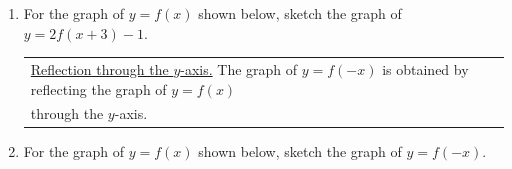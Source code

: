 \begin{enumerate}
\newpage
\item For the graph of $y=f(x)$ shown below, sketch the graph of $y=2f(x+3)-1$. \\
%
%
%
%



\begin{tabular}{| l |} \hline \underline{Reflection through the $y$-axis.} The graph of $y=f(-x)$ is obtained by reflecting the graph of $y=f(x)$ \\ through the $y$-axis.
 \\ \hline
\end{tabular} 

\vspace{-.1in}
\item For the graph of $y=f(x)$ shown below, sketch the graph of $y=f(-x)$.\\







\end{enumerate}

